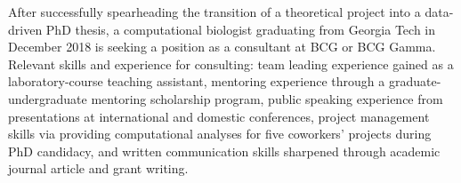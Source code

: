 

\begin{cventries}


\fontsize{10pt}{1em}\bodyfontlight\upshape\color{black}\justify
After successfully spearheading the transition of a theoretical project into a data-driven PhD thesis, a computational biologist graduating from Georgia Tech in December 2018 is seeking a position as a consultant at BCG or BCG Gamma. Relevant skills and experience for consulting: team leading experience gained as a laboratory-course teaching assistant, mentoring experience through a graduate-undergraduate mentoring scholarship program, public speaking experience from presentations at international and domestic conferences, project management skills via providing computational analyses for five coworkers' projects during PhD candidacy, and written communication skills sharpened through academic journal article and grant writing.
    
\vspace{-2.0mm}
\end{cventries}
